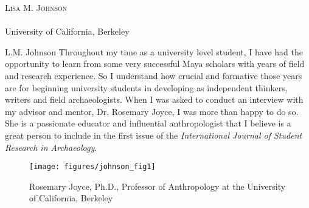 \openingarticle
\def\ppages{\pagerange{Johnson:firstpage}{Johnson:lastpage}}
\def\shorttitle{Interview: Rosemary Joyce}
\def\shortauthor{Lisa M. Johnson}
\def\authormail{llomitola@berkeley.edu}
\def\maintitle{Rosemary Joyce, Ph.D. \textit{Professor of Anthropology at the University of California, Berkeley}}
\def\affiliation{University of California, Berkeley}
\begin{center}
	{\Large\scshape\shortauthor}\\[1em]
	\email \\
	\affiliation
\end{center}
\vspace{3em}
\midarticle
 \label{Johnson:firstpage}
 	

\begin{aquote}{L.M. Johnson}
Throughout my time as a university level student, I have had the opportunity to learn from some very successful Maya scholars with years of field and research experience.  So I understand how crucial and formative those years are for beginning university students in developing as independent thinkers, writers and field archaeologists.  When I was asked to conduct an interview with my advisor and mentor, Dr. Rosemary Joyce, I was more than happy to do so.  She is a passionate educator and influential anthropologist that I believe is a great person to include in the first issue of the \emph{International Journal of Student Research in Archaeology}.
\end{aquote}
	
	\begin{figure}
		\texttt{[image: figures/johnson\_fig1]}
		\centering
		\caption{Rosemary Joyce, Ph.D., Professor of Anthropology at the University of California, Berkeley}
		\label{fig:Johnson:Fig1}
	\end{figure}
	
